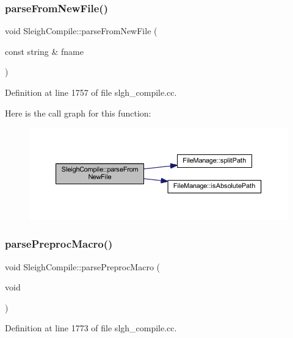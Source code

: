 \subsubsection{\texorpdfstring{parseFromNewFile()}{parseFromNewFile()}}
{\footnotesize\ttfamily void Sleigh\+Compile\+::parse\+From\+New\+File (\begin{DoxyParamCaption}\item[{const string \&}]{fname }\end{DoxyParamCaption})}



Definition at line 1757 of file slgh\+\_\+compile.\+cc.

Here is the call graph for this function\+:
\nopagebreak
\begin{figure}[H]
\begin{center}
\leavevmode
\includegraphics[width=350pt]{class_sleigh_compile_aaf7be52d56942f5de10d908e00826d22_cgraph}
\end{center}
\end{figure}
\mbox{\label{class_sleigh_compile_a0e8ce37c68e8460ca6d82e45b55d7ac7}} 
\subsubsection{\texorpdfstring{parsePreprocMacro()}{parsePreprocMacro()}}
{\footnotesize\ttfamily void Sleigh\+Compile\+::parse\+Preproc\+Macro (\begin{DoxyParamCaption}\item[{void}]{ }\end{DoxyParamCaption})}



Definition at line 1773 of file slgh\+\_\+compile.\+cc.

\mbox{\label{class_sleigh_compile_a6debbf54d93edca9385ae391968bec76}} 
